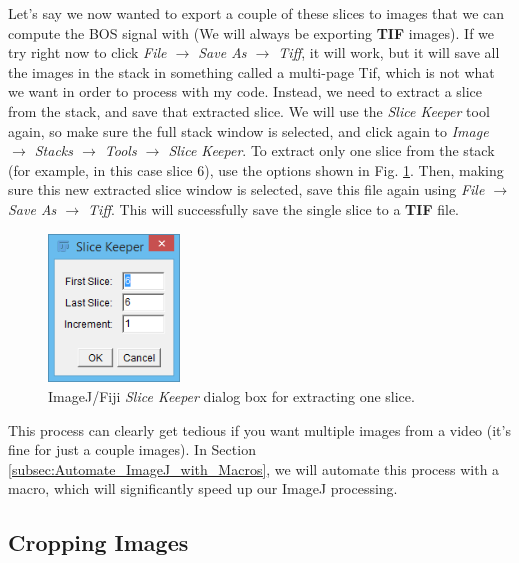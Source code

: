 \documentclass[letterpaper,12pt]{article}
\begin{document}
Let's say we now wanted to export a couple of these slices to images that we can compute the BOS signal with (We will always be exporting \textbf{TIF} images).  If we try right now to click \textcolor{myMagenta}{\textit{File $\rightarrow$ Save As $\rightarrow$ Tiff}}, it will work, but it will save all the images in the stack in something called a multi-page Tif, which is not what we want in order to process with my code.  Instead, we need to extract a slice from the stack, and save that extracted slice. We will use the \textcolor{myMagenta}{\textit{Slice Keeper}} tool again, so make sure the full stack window is selected, and click again to \textcolor{myMagenta}{\textit{Image $\rightarrow$ Stacks $\rightarrow$ Tools $\rightarrow$ Slice Keeper}}.  To extract only one slice from the stack (for example, in this case slice $6$), use the options shown in Fig. \ref{fig:ImageJ_Slice_Keeper_Options_2}.  Then, making sure this new extracted slice window is selected, save this file again using \textcolor{myMagenta}{\textit{File $\rightarrow$ Save As $\rightarrow$ Tiff}}.  This will successfully save the single slice to a \textbf{TIF} file.

\begin{figure}[h]
    \centering
    \includegraphics[width=3.5cm]{ImageJ_Slice_Keeper_Options_2.PNG}
    \caption{ImageJ/Fiji \textit{Slice Keeper} dialog box for extracting one slice.}
    \label{fig:ImageJ_Slice_Keeper_Options_2}
\end{figure}

This process can clearly get tedious if you want multiple images from a video (it's fine for just a couple images).  In Section \ref{subsec:Automate_ImageJ_with_Macros}, we will automate this process with a macro, which will significantly speed up our ImageJ processing.

\subsection{Cropping Images}
\label{subsec:Cropping_Images}
\end{document}

